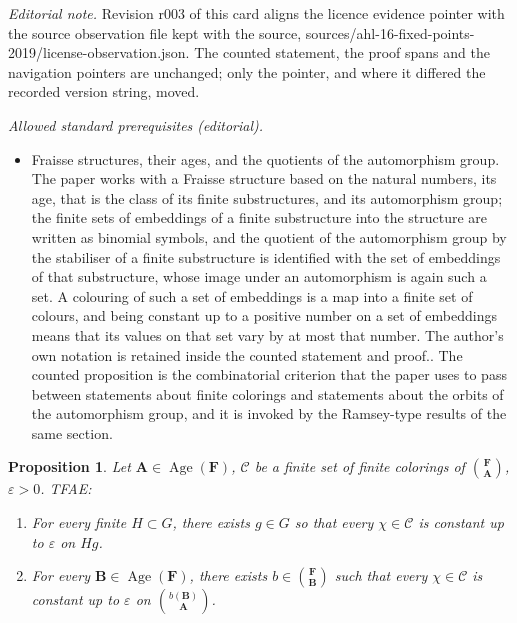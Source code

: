 \documentclass[10pt,a4paper]{article}
\newtheorem{prop}[theo]{Proposition}
\theoremstyle{definition}
\numberwithin{equation}{section}
\numberwithin{figure}{section}
\numberwithin{table}{section}
\newcommand*{\mA}{\mathbf{A}}
\newcommand*{\mB}{\mathbf{B}}
\newcommand*{\mF}{\mathbf{F}}
\newcommand{\e}{\varepsilon}
\DeclareMathOperator{\Age}{Age}
\begin{document}
\noindent\textit{Editorial note.} Revision r003 of this card aligns the licence evidence pointer with the source observation file kept with the source, sources/ahl-16-fixed-points-2019/license-observation.json. The counted statement, the proof spans and the navigation pointers are unchanged; only the pointer, and where it differed the recorded version string, moved.\par\medskip
\noindent\textit{Allowed standard prerequisites (editorial).}\begin{itemize}
\item Fraisse structures, their ages, and the quotients of the automorphism group. The paper works with a Fraisse structure based on the natural numbers, its age, that is the class of its finite substructures, and its automorphism group; the finite sets of embeddings of a finite substructure into the structure are written as binomial symbols, and the quotient of the automorphism group by the stabiliser of a finite substructure is identified with the set of embeddings of that substructure, whose image under an automorphism is again such a set. A colouring of such a set of embeddings is a map into a finite set of colours, and being constant up to a positive number on a set of embeddings means that its values on that set vary by at most that number. The author's own notation is retained inside the counted statement and proof.. The counted proposition is the combinatorial criterion that the paper uses to pass between statements about finite colorings and statements about the orbits of the automorphism group, and it is invoked by the Ramsey-type results of the same section.
\end{itemize}\medskip
\begin{prop}\label{prop:aOSRamsey}
Let $\mA \in \Age(\mF)$, $\mathcal C$ be a finite set of finite colorings of $\binom{\mF}{\mA}$, $\e>0$. TFAE:
\begin{enumerate}
\item For every finite $H\subset G$, there exists $g\in G$ so that every $\chi \in \mathcal C$ is constant up to $\varepsilon$ on $Hg$.

\item For every $\mB \in \Age(\mF)$, there exists $b\in \binom{\mF}{\mB}$ such that every $\chi\in \mathcal C$ is constant up to $\e$ on $\binom{b(\mB)}{\mA}$.
\end{enumerate}
\end{prop}
\end{document}
